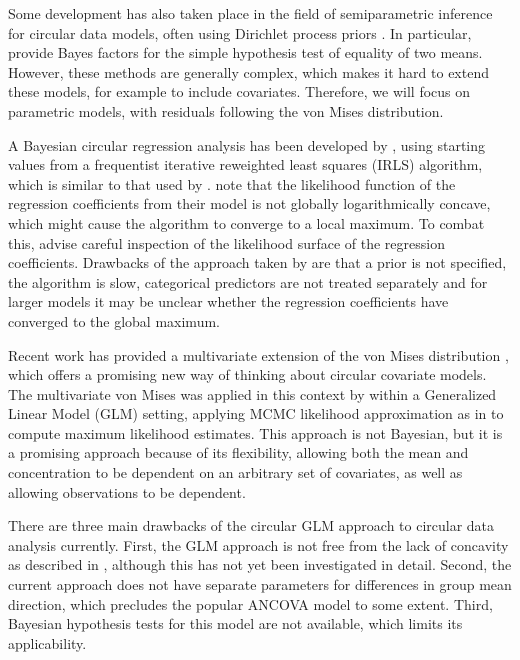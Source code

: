 Some development has also taken place in the field of semiparametric inference for circular data models, often using Dirichlet process priors \citep{Bhattacharya2009, ghosh2003semiparametric, george2006semiparametric, mcvinish2008semiparametric}. In particular, \citet{ghosh2003semiparametric} provide Bayes factors for the simple hypothesis test of equality of two means. However, these methods are generally complex, which makes it hard to extend these models, for example to include covariates. Therefore, we will focus on parametric models, with residuals following the von Mises distribution.

A Bayesian circular regression analysis has been developed by \citet{gill2010}, using starting values from a frequentist iterative reweighted least squares (IRLS) algorithm, which is similar to that used by \citet{fisher1992regression}. \citet{gill2010} note that the likelihood function of the regression coefficients from their model is not globally logarithmically concave, which might cause the algorithm to converge to a local maximum. To combat this, \citet{gill2010} advise careful inspection of the likelihood surface of the regression coefficients. Drawbacks of the approach taken by \citet{gill2010} are that a prior is not specified, the algorithm is slow, categorical predictors are not treated separately and for larger models it may be unclear whether the regression coefficients have converged to the global maximum.

Recent work has provided a multivariate extension of the von Mises distribution \citep{mardia2008multivariate,mardia2014some}, which offers a promising new way of thinking about circular covariate models. The multivariate von Mises was applied in this context by \citet{lagona2016regression} within a Generalized Linear Model (GLM) setting, applying MCMC likelihood approximation as in \citet{geyer1992constrained} to compute maximum likelihood estimates. This approach is not Bayesian, but it is a promising approach because of its flexibility, allowing both the mean and concentration to be dependent on an arbitrary set of covariates, as well as allowing observations to be dependent.

There are three main drawbacks of the circular GLM approach  to circular data analysis currently. First, the GLM approach is not free from the lack of concavity as described in \citet{gill2010}, although this has not yet been investigated in detail. Second, the current approach does not have separate parameters for differences in group mean direction, which precludes the popular ANCOVA model to some extent. Third, Bayesian hypothesis tests for this model are not available, which limits its applicability.

